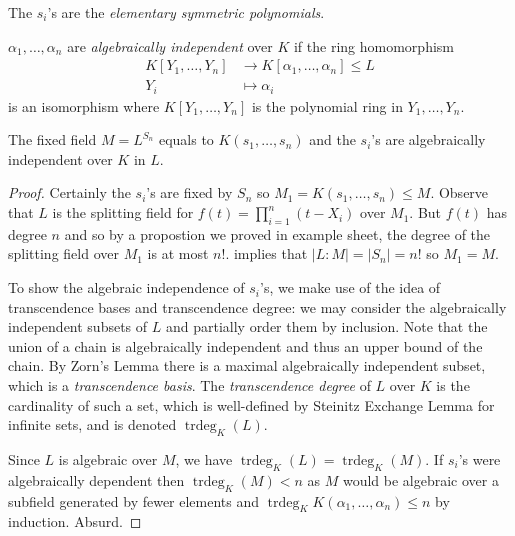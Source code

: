 \documentclass[a4paper]{article}
\DeclareMathOperator{\trdeg}{trdeg}
\begin{document}
\begin{definition}
  The \(s_i\)'s are the \emph{elementary symmetric polynomials}.
\end{definition}

\begin{definition}
  \(\alpha_1, \dots, \alpha_n\) are \emph{algebraically independent} over \(K\) if the ring homomorphism
    \begin{align*}
      K[Y_1, \dots, Y_n] &\to K[\alpha_1, \dots, \alpha_n] \leq L \\
      Y_i &\mapsto \alpha_i
    \end{align*}
    is an isomorphism where \(K[Y_1, \dots, Y_n]\) is the polynomial ring in \(Y_1, \dots, Y_n\).
\end{definition}

\begin{theorem}
  The fixed field \(M = L^{S_n}\) equals to \(K(s_1, \dots, s_n)\) and the \(s_i\)'s are algebraically independent over \(K\) in \(L\).
\end{theorem}

\begin{proof}
  Certainly the \(s_i\)'s are fixed by \(S_n\) so \(M_1 = K(s_1, \dots, s_n) \leq M\). Observe that \(L\) is the splitting field for \(f(t) = \prod_{i = 1}^n (t - X_i)\) over \(M_1\). But \(f(t)\) has degree \(n\) and so by a propostion we proved in example sheet, the degree of the splitting field over \(M_1\) is at most \(n!\).  implies that \(|L:M| = |S_n| = n!\) so \(M_1 = M\).

  To show the algebraic independence of \(s_i\)'s, we make use of the idea of transcendence bases and transcendence degree: we may consider the algebraically independent subsets of \(L\) and partially order them by inclusion. Note that the union of a chain is algebraically independent and thus an upper bound of the chain. By Zorn's Lemma there is a maximal algebraically independent subset, which is a \emph{transcendence basis}. The \emph{transcendence degree} of \(L\) over \(K\) is the cardinality of such a set, which is well-defined by Steinitz Exchange Lemma for infinite sets, and is denoted \(\trdeg_K(L)\).

  Since \(L\) is algebraic over \(M\), we have \(\trdeg_K(L) = \trdeg_K(M)\). If \(s_i\)'s were algebraically dependent then \(\trdeg_K(M) < n\) as \(M\) would be algebraic over a subfield generated by fewer elements and \(\trdeg_K K(\alpha_1, \dots, \alpha_n) \leq n\) by induction. Absurd.
\end{proof}
\end{document}
